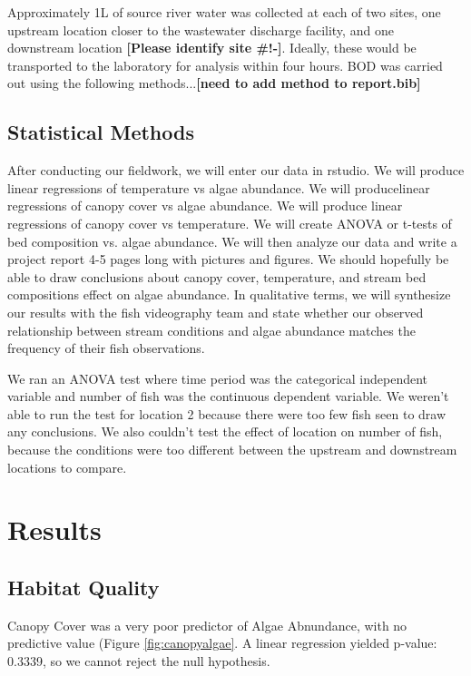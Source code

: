 \documentclass{article}
\begin{document}
Approximately 1L of source river water was collected at each of two sites, one upstream location closer to the wastewater discharge facility, and one downstream location \textbf{[Please identify site \#!-]}. Ideally, these would be transported to the laboratory for analysis within four hours. BOD was carried out using the following methods...\textbf{[need to add method to report.bib]}

\subsection{Statistical Methods}

After conducting our ﬁeldwork, we will enter our data in rstudio. We will produce linear regressions of temperature vs algae abundance. We will producelinear regressions of canopy cover vs algae abundance. We will produce linear regressions of canopy cover vs temperature. We will create ANOVA or t-tests of bed composition vs. algae abundance. We will then analyze our data and write a project report 4-5 pages long with pictures and ﬁgures. We should hopefully be able to draw conclusions about canopy cover, temperature, and stream bed compositions eﬀect on algae abundance. In qualitative terms, we will synthesize our results with the ﬁsh videography team and state whether our observed relationship between stream conditions and algae abundance matches the frequency of their ﬁsh observations.


We ran an ANOVA test where time period was the categorical independent variable and number of fish was the continuous dependent variable.  We weren't able to run the test for location 2 because there were too few fish seen to draw any conclusions.  We also couldn't test the effect of location on number of fish, because the conditions were too different between the upstream and downstream locations to compare.

\section{Results}


\subsection{Habitat Quality}

Canopy Cover was a very poor predictor of Algae Abnundance, with no predictive value (Figure \ref{fig:canopyalgae}. A linear regression yielded p-value: 0.3339, so we cannot reject the null hypothesis.
\end{document}
